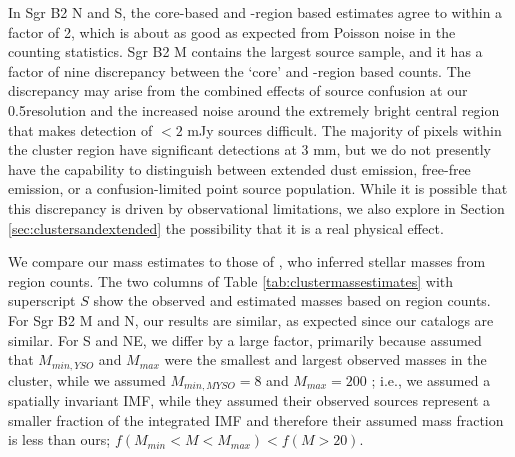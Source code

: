 \documentclass[twocolumn]{aastex61}
\begin{document}
In Sgr B2 N and S, the core-based
and \hii-region based estimates agree to within a factor of 2, which is about
as good as expected from Poisson noise in the counting statistics.  
Sgr B2 M contains the largest source sample, and it has a factor of nine
discrepancy between the `core' and \HII-region based counts. The discrepancy
may arise from the combined effects of source
confusion at our 0.5\arcsec resolution and the increased noise around the
extremely bright central region that makes detection of $<2$ mJy sources
difficult.  The majority of pixels within the cluster region have significant
detections at 3 mm, but we do not presently have the capability to distinguish
between extended dust emission, free-free emission, or a confusion-limited
point source population.  While it is possible that this discrepancy
is driven by observational limitations, we also explore in Section
\ref{sec:clustersandextended} the possibility that it is a real physical
effect.

We compare our mass estimates to those of \citet{Schmiedeke2016a}, who inferred
stellar masses from \hii region counts.  The  two columns of Table
\ref{tab:clustermassestimates} with superscript $S$ show the observed and
estimated masses based on
\hii region counts.  For Sgr B2 M and N, our results are similar, as expected
since our catalogs are similar.  For S and NE, we differ by a large factor,
primarily because \citet{Schmiedeke2016a} assumed that $M_{min,YSO}$ and $M_{max}$
were the smallest and largest observed masses in the cluster, while we assumed
$M_{min,MYSO}=8$ \msun and $M_{max}=200$ \msun; i.e., we assumed a spatially
invariant IMF, while they assumed their observed sources represent a smaller
fraction of the integrated IMF and therefore their assumed mass fraction is
less than ours; $f(M_{min}< M < M_{max}) < f(M>20)$.


\end{document}
